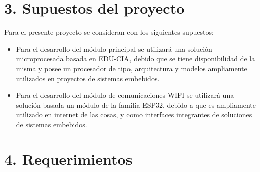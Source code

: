\documentclass[11pt]{charter}
\begin{document}
\section{3. Supuestos del proyecto}
\label{sec:supuestos}

Para el presente proyecto se consideran con los siguientes supuestos:
\begin{itemize}
\item Para el desarrollo del módulo principal se utilizará una solución microprocesada basada en
EDU-CIA, debido que se tiene disponibilidad de la misma y posee un procesador de tipo,
arquitectura y modelos ampliamente utilizados en proyectos de sistemas embebidos.
\item Para el desarrollo del módulo de comunicaciones WIFI se utilizará una solución basada un módulo de la familia ESP32, debido a que es ampliamente utilizado en internet de las cosas, y como interfaces integrantes de soluciones de sistemas embebidos.
\end{itemize}
\section{4. Requerimientos}
\label{sec:requerimientos}
\end{document}
